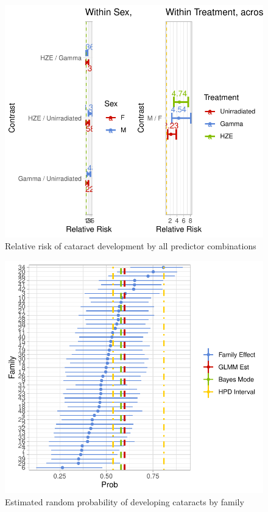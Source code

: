 \documentclass[12pt]{article}
\begin{document}
\begin{figure}[H]

{\centering \includegraphics{bookdown_report_files/figure-latex/RR-1} 

}

\caption{Relative risk of cataract development by all predictor combinations}\label{fig:RR}
\end{figure}

\begin{figure}[H]

{\centering \includegraphics{bookdown_report_files/figure-latex/re-1} 

}

\caption{Estimated random probability of developing cataracts by family}\label{fig:re}
\end{figure}
\end{document}
